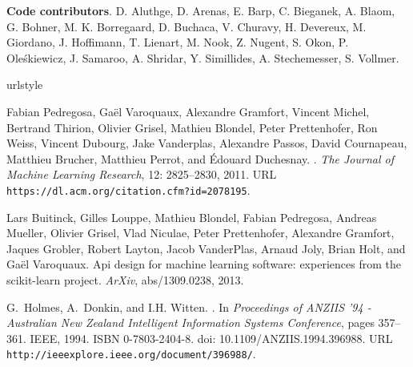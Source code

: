 \documentclass{article}
\begin{document}
\textbf{Code contributors}. D. Aluthge, D. Arenas, E. Barp,
C. Bieganek, A. Blaom, G. Bohner, M. K. Borregaard, D. Buchaca,
V. Churavy, H. Devereux, M. Giordano, J. Hoffimann, T. Lienart,
M. Nook, Z. Nugent, S. Okon, P. Oleśkiewicz, J. Samaroo, A. Shridar,
Y. Simillides, A. Stechemesser, S. Vollmer.



\providecommand{\natexlab}[1]{#1}
\providecommand{\url}[1]{\texttt{#1}}
\expandafter\ifx\csname urlstyle\endcsname\relax
  \providecommand{\doi}[1]{doi: #1}\else
  \providecommand{\doi}{doi: \begingroup \urlstyle{rm}\Url}\fi

\begin{thebibliography}{18}
Fabian Pedregosa, Ga{\"{e}}l Varoquaux, Alexandre Gramfort, Vincent Michel,
  Bertrand Thirion, Olivier Grisel, Mathieu Blondel, Peter Prettenhofer, Ron
  Weiss, Vincent Dubourg, Jake Vanderplas, Alexandre Passos, David Cournapeau,
  Matthieu Brucher, Matthieu Perrot, and {\'{E}}douard Duchesnay.
.
\newblock \emph{The Journal of Machine Learning Research}, 12:
  2825--2830, 2011.
\newblock URL \url{https://dl.acm.org/citation.cfm?id=2078195}.

Lars Buitinck, Gilles Louppe, Mathieu Blondel, Fabian Pedregosa, Andreas
  Mueller, Olivier Grisel, Vlad Niculae, Peter Prettenhofer, Alexandre
  Gramfort, Jaques Grobler, Robert Layton, Jacob VanderPlas, Arnaud Joly, Brian
  Holt, and Ga{\"e}l Varoquaux.
\newblock Api design for machine learning software: experiences from the
  scikit-learn project.
\newblock \emph{ArXiv}, abs/1309.0238, 2013.

G.~Holmes, A.~Donkin, and I.H. Witten.
.
\newblock In \emph{Proceedings of ANZIIS '94 - Australian New Zealand
  Intelligent Information Systems Conference}, pages 357--361. IEEE, 1994.
\newblock ISBN 0-7803-2404-8.
\newblock \doi{10.1109/ANZIIS.1994.396988}.
\newblock URL \url{http://ieeexplore.ieee.org/document/396988/}.


\end{thebibliography}
\end{document}
